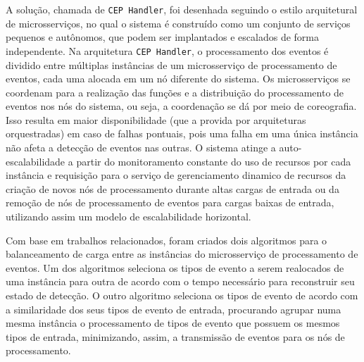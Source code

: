 A solução, chamada de \texttt{CEP Handler}, foi desenhada seguindo o estilo arquitetural de microsserviços, no qual o sistema é construído como um conjunto de serviços pequenos e autônomos, que podem ser implantados e escalados de forma independente. 
Na arquitetura \texttt{CEP Handler}, o processamento dos eventos é dividido entre múltiplas instâncias de um microsserviço de processamento de eventos, cada uma alocada em um nó diferente do sistema. Os microsserviços se coordenam para a realização das funções e a distribuição do processamento de eventos nos nós do sistema, ou seja, a coordenação se dá por meio de coreografia. Isso resulta em maior disponibilidade (que a provida por arquiteturas orquestradas) em caso de falhas pontuais, pois uma falha em uma única instância não afeta a detecção de eventos nas outras. O sistema atinge a auto-escalabilidade a partir do monitoramento constante do uso de recursos por cada instância e requisição para o serviço de gerenciamento dinamico de recursos da criação de novos nós de processamento durante altas cargas de entrada ou da remoção de nós de processamento de eventos para cargas baixas de entrada, utilizando assim um modelo de escalabilidade horizontal.



Com base em trabalhos relacionados, foram  criados dois algoritmos para o balanceamento de carga entre as instâncias do microsserviço de processamento de eventos. Um dos algoritmos seleciona os tipos de evento a serem realocados de uma instância para outra de acordo com o tempo necessário para reconstruir seu estado de detecção. O outro algoritmo seleciona os tipos de evento de acordo com a similaridade dos seus tipos de evento de entrada, procurando agrupar numa mesma instância o processamento de tipos de evento que possuem os mesmos tipos de entrada, minimizando, assim, a transmissão de eventos para os nós de processamento.

 
